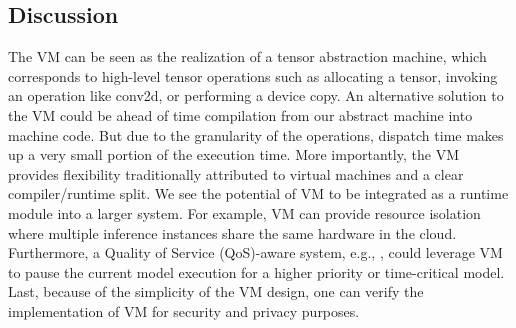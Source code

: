 \begin{comment}
\lstset { %
    language=C++,
    basicstyle=\ttfamily\footnotesize,%
    keywordstyle=\bfseries\color{green!40!black},
    commentstyle=\itshape\color{purple!40!black},
    stringstyle=\color{orange},
}
\begin{figure}[htbp]
\centering
\begin{lstlisting}
void RunLoop() {
  this->pc = 0;
  Index frame_start = frames.size();
  while (true) {
  main_loop:
    auto const& instr = this->code[this->pc];
    switch (instr.op) {
      case Opcode::LoadConst: {
        auto constant_obj = constants[instr.kidx];
        // ...
        RegWrite(instr.dst, const_pool_[instr.kidx]);
        pc++;
        goto main_loop;
      }
      case Opcode::Invoke: {
        // Prepare args and then invoke.
        InvokeGlobal(functions[instr.func_idx], args);
        frames.back().caller_ret_reg = instr.dst;
        goto main_loop;
      }
      case Opcode::InvokePacked: {
        // Invoke primitive functions
        const auto& func = packed_funcs[instr.pidx];
        const auto& arity = instr.arity;
        // Read args from the register file.
        InvokePacked(instr.pidx, func, arity,
                     instr.osize, args);
        // Write outputs to the register file.
        pc++;
        goto main_loop;
      }
      // Other opcodes are omitted
    }
  }
}
\end{lstlisting}
\caption{Relay bytecode interpreter.}
\label{fig:interpreter}
\end{figure}
\end{comment}

\subsection{Discussion}


The VM can be seen as the realization of a tensor abstraction machine, which corresponds to high-level tensor operations such as allocating a tensor, invoking an operation like conv2d, or performing a device copy.
An alternative solution to the VM could be ahead of time compilation from our abstract machine into machine code.
But due to the granularity of the operations, dispatch time makes up a very small portion of the execution time.
More importantly, the VM provides flexibility traditionally attributed to virtual machines and a clear compiler/runtime split.
We see the potential of VM to be integrated as a runtime module into a larger system.
For example, VM can provide resource isolation where multiple inference instances share the same hardware in the cloud.
Furthermore, a Quality of Service (QoS)-aware system, e.g., \citep{kang2018hotmobile, Yachir2009rsj}, could leverage VM to pause the
current model execution for a higher priority or time-critical model. Last, because of the simplicity of the VM design, one can verify the implementation of VM for security and privacy purposes.

